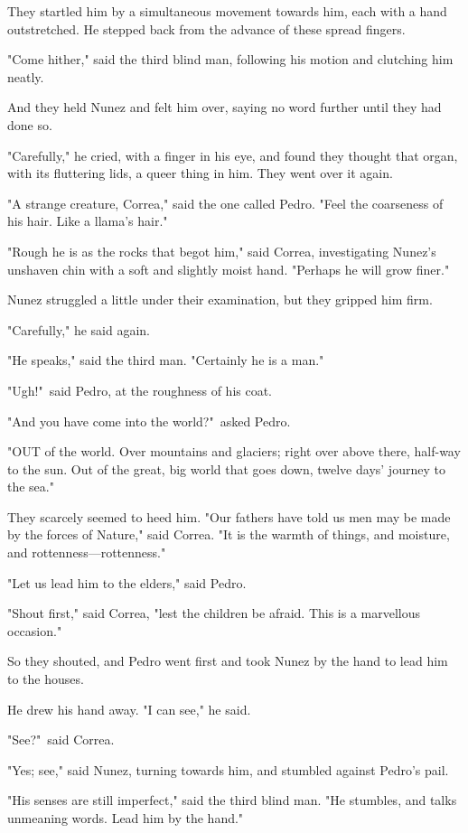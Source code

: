 \documentclass[courier]{sffms}
\begin{document}
They startled him by a simultaneous movement towards him, each with a
hand outstretched. He stepped back from the advance of these spread
fingers.

"Come hither," said the third blind man, following his motion and
clutching him neatly.

And they held Nunez and felt him over, saying no word further until
they had done so.

"Carefully," he cried, with a finger in his eye, and found they
thought that organ, with its fluttering lids, a queer thing in
him. They went over it again.

"A strange creature, Correa," said the one called Pedro. "Feel the
coarseness of his hair. Like a llama's hair."

"Rough he is as the rocks that begot him," said Correa, investigating
Nunez's unshaven chin with a soft and slightly moist hand. "Perhaps he
will grow finer."

Nunez struggled a little under their examination, but they gripped him
firm.

"Carefully," he said again.

"He speaks," said the third man. "Certainly he is a man."

"Ugh!"\ said Pedro, at the roughness of his coat.

"And you have come into the world?"\ asked Pedro.

"OUT of the world. Over mountains and glaciers; right over above
there, half-way to the sun. Out of the great, big world that goes
down, twelve days' journey to the sea."

They scarcely seemed to heed him. "Our fathers have told us men may be
made by the forces of Nature," said Correa. "It is the warmth of
things, and moisture, and rottenness---rottenness."

"Let us lead him to the elders," said Pedro.

"Shout first," said Correa, "lest the children be afraid. This is a
marvellous occasion."

So they shouted, and Pedro went first and took Nunez by the hand to
lead him to the houses.

He drew his hand away. "I can see," he said.

"See?"\ said Correa.

"Yes; see," said Nunez, turning towards him, and stumbled against
Pedro's pail.

"His senses are still imperfect," said the third blind man. "He
stumbles, and talks unmeaning words. Lead him by the hand."
\end{document}
